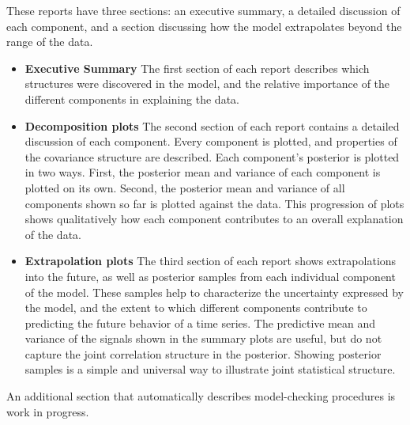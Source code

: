 \documentclass{article} %
\begin{document}
These reports have three sections: an executive summary, a detailed discussion of each component, and a section discussing how the model extrapolates beyond the range of the data.

\begin{itemize}
\item { \bf Executive Summary} The first section of each report describes which structures were discovered in the model, and the relative importance of the different components in explaining the data.
\item { \bf Decomposition plots}
The second section of each report contains a detailed discussion of each component.
Every component is plotted, and properties of the covariance structure are described.
Each component's posterior is plotted in two ways.  First, the posterior mean and variance of each component is plotted on its own.  Second, the posterior mean and variance of all components shown so far is plotted against the data.  This progression of plots 
shows qualitatively how each component contributes to an overall explanation of the data.
\item {\bf Extrapolation plots}
The third section of each report shows extrapolations into the future, as well as posterior samples from each individual component of the model.  These samples help to characterize the uncertainty expressed by the model, and the extent to which different components contribute to predicting the future behavior of a time series.
%
The predictive mean and variance of the signals shown in the summary plots are useful, but do not capture the joint correlation structure in the posterior.  Showing posterior samples is a simple and universal way to illustrate joint statistical structure.
\end{itemize}

An additional section that automatically describes model-checking procedures is work in progress.

\end{document}
